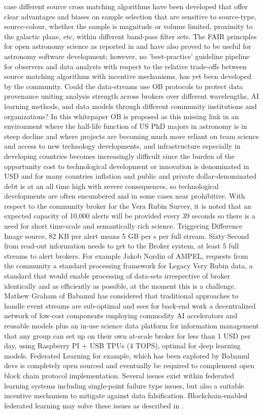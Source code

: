\documentclass[final,5p,times,twocolumn,authoryear]{elsarticle}
\begin{document}
case different source cross matching algorithms have been developed that offer clear advantages and biases on sample selection that are sensitive to source-type, source-colour, whether the sample is magnitude or volume limited, proximity to the galactic plane, etc,  within different band-pass filter sets. The FAIR principles for open astronomy science as reported in \cite{2022arXiv220310710O} and \cite{molinaro21} have also proved to be useful for astronomy software development; however, no 'best-practice' guideline pipeline for observers and data analysts with respect to the relative trade-offs between source matching algorithms with incentive mechanisms, has yet been developed by the community.
 Could the data-streams use OB protocols to protect data provenance uniting analysis strength across brokers over different wavelengths, AI learning methods, and data models through different community institutions and organizations? In this whitepaper OB is proposed as this missing link in an environment where the half-life function of US PhD majors in astronomy is in steep decline and where projects are becoming much more reliant on team science and access to new technology developments, and infrastructure especially in developing countries becomes increasingly difficult since the burden of the opportunity cost to technological development or innovation is denominated in USD and for many countries inflation and public and private dollar-denominated debt is at an all time high with severe consequences, so technological developments are often encumbered and in some cases near prohibitive. With respect to the community broker for the Vera Rubin Survey, it is noted that an expected capacity of 10,000 alerts will be provided every 39 seconds so there is a need for short time-scale and semantically rich science. Triggering Difference Image source, 82 KB per alert means 5 GB per s per full stream. Sixty Second from read-out information needs to get to the Broker system, at least 5 full streams to alert brokers.   For example  Jakob Nordin of AMPEL, requests from the community a standard processing framework for Legacy Very Rubin data, a standard that would enable processing of data-sets irrespective of broker identically and as efficiently as possible, at the moment this is a challenge.  Mathew Graham of Babamul has considered that traditional approaches to handle event streams are sub-optimal and sees for back-end work a decentralized network of low-cost components employing commodity AI accelerators and reusable models plus an in-use science data platform for information management that any group can set up on their own at-scale broker for less than 1 USD per day, using Raspberry PI + USB TPUs (4 TOPS), optimal for deep learning models.  Federated Learning for example, which has been explored by Babamul devs is completely open sourced and eventually be required to complement open block chain protocol implementation. Several issues exist within federated learning systems including single-point failure type issues, but also a suitable incentive mechanism to mitigate against data falsification. Blockchain-enabled federated learning may solve these issues as described in \cite{zhu2023}. 
\end{document}
